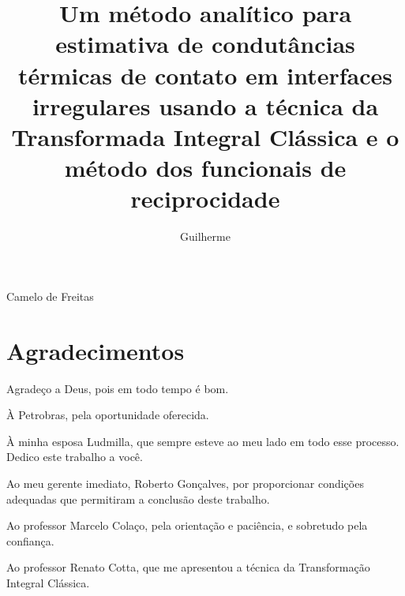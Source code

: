 \documentclass[msc,numbers, fleqn]{coppe}
\numberwithin{figure}{section}
\numberwithin{table}{section}
\numberwithin{equation}{section}
\begin{document}


\title{Um método analítico para estimativa
de condutâncias térmicas de contato em interfaces irregulares usando a
técnica da Transformada Integral Clássica e o método dos funcionais de reciprocidade}
  \author{Guilherme}{Camelo de Freitas}
  \date{\month}{\the\year}
  
 
 \maketitle
 
 \frontmatter
  \dedication{À Ludmilla, minha esposa, minha companheira, minha amiga, meu alicerce. Te amo!}
  
  \chapter*{Agradecimentos}
  
  Agradeço a Deus, pois em todo tempo é bom.
  
  À Petrobras, pela oportunidade oferecida.
  
  À minha esposa Ludmilla, que sempre esteve ao meu lado em todo esse processo. Dedico este trabalho a você.

  Ao meu gerente imediato, Roberto Gonçalves, por proporcionar condições adequadas que permitiram a conclusão deste trabalho.
  
  Ao professor Marcelo Colaço, pela orientação e paciência, e sobretudo pela confiança.
  
  Ao professor Renato Cotta, que me apresentou a técnica da Transformação Integral Clássica.
  
\end{document}
